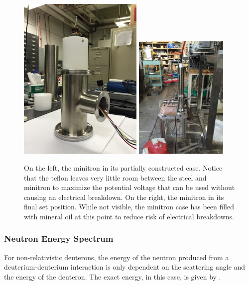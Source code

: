 \begin{figure}[t]
	\centering
	\includegraphics[width=0.533\textwidth]{nerix_minitron_partial_case}
	\includegraphics[width=0.4\textwidth]{nerix_minitron_set}
	\caption{On the left, the minitron in its partially constructed case.  Notice that the teflon leaves very little room between the steel and minitron to maximize the potential voltage that can be used without causing an electrical breakdown.  On the right, the minitron in its final set position.  While not visible, the minitron case has been filled with mineral oil at this point to reduce risk of electrical breakdowns.}
	\label{fig:nerix_minitron_rate}
\end{figure}


\subsubsection{Neutron Energy Spectrum}

For non-relativistic deuterons,  the energy of the neutron produced from a deuterium-deuterium interaction is only dependent on the scattering angle and the energy of the deuteron.  The exact energy, in this case, is given by  \cite{csikai1987crc}. 

